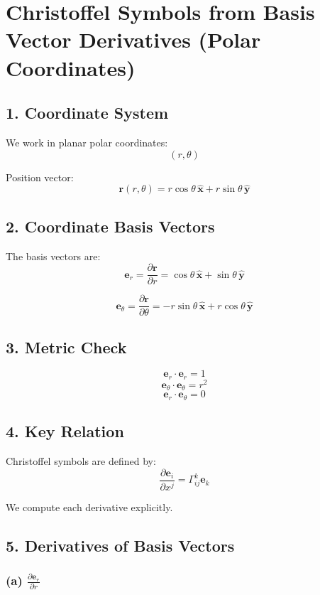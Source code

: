\documentclass{article}
\begin{document}
	
	\section*{Christoffel Symbols from Basis Vector Derivatives (Polar Coordinates)}
	
	\subsection*{1. Coordinate System}
	
	We work in planar polar coordinates:
	\[
	(r,\theta)
	\]
	
	Position vector:
	\[
	\mathbf{r}(r,\theta) = r \cos\theta \, \hat{\mathbf{x}} + r \sin\theta \, \hat{\mathbf{y}}
	\]
	
	\subsection*{2. Coordinate Basis Vectors}
	
	The basis vectors are:
	\[
	\mathbf{e}_r = \frac{\partial \mathbf{r}}{\partial r}
	= \cos\theta \, \hat{\mathbf{x}} + \sin\theta \, \hat{\mathbf{y}}
	\]
	
	\[
	\mathbf{e}_\theta = \frac{\partial \mathbf{r}}{\partial \theta}
	= -r\sin\theta \, \hat{\mathbf{x}} + r\cos\theta \, \hat{\mathbf{y}}
	\]
	
	\subsection*{3. Metric Check}
	
	\[
	\mathbf{e}_r \cdot \mathbf{e}_r = 1
	\]
	\[
	\mathbf{e}_\theta \cdot \mathbf{e}_\theta = r^2
	\]
	\[
	\mathbf{e}_r \cdot \mathbf{e}_\theta = 0
	\]
	
	\subsection*{4. Key Relation}
	
	Christoffel symbols are defined by:
	\[
	\frac{\partial \mathbf{e}_i}{\partial x^j}
	=
	\Gamma^k_{ij} \mathbf{e}_k
	\]
	
	We compute each derivative explicitly.
	
	\subsection*{5. Derivatives of Basis Vectors}
	
	\subsubsection*{(a) $\frac{\partial \mathbf{e}_r}{\partial r}$}
	
\end{document}
